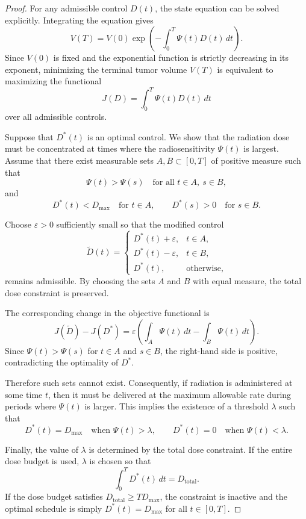 \documentclass[10pt,a4paper]{amsart}
\begin{document}
\begin{proof}
For any admissible control $D(t)$, the state equation can be solved explicitly. Integrating the equation gives
\[
V(T) = V(0)\exp\!\left(-\int_0^T \Psi(t)D(t)\,dt\right).
\]
Since $V(0)$ is fixed and the exponential function is strictly decreasing in its exponent, minimizing the terminal tumor volume
$V(T)$ is equivalent to maximizing the functional
\[
J(D) = \int_0^T \Psi(t)D(t)\,dt
\]
over all admissible controls.

Suppose that $D^*(t)$ is an optimal control. We show that the radiation dose must be concentrated at times where the radiosensitivity $\Psi(t)$ is largest. Assume that there exist measurable sets $A,B\subset[0,T]$ of positive measure such that
\[
\Psi(t)>\Psi(s) \quad \text{for all } t\in A,\ s\in B,
\]
and
\[
D^*(t) < D_{\max} \quad \text{for } t\in A, 
\qquad
D^*(s) > 0 \quad \text{for } s\in B.
\]

Choose $\varepsilon>0$ sufficiently small so that the modified control
\[
\widetilde D(t) =
\begin{cases}
D^*(t)+\varepsilon, & t\in A,\\
D^*(t)-\varepsilon, & t\in B,\\
D^*(t), & \text{otherwise},
\end{cases}
\]
remains admissible. By choosing the sets $A$ and $B$ with equal measure, the total dose constraint is preserved.

The corresponding change in the objective functional is
\[
J(\widetilde D) - J(D^*)
= \varepsilon
\left(
\int_A \Psi(t)\,dt
-
\int_B \Psi(t)\,dt
\right).
\]
Since $\Psi(t)>\Psi(s)$ for $t\in A$ and $s\in B$, the right-hand side is positive, contradicting the optimality of $D^*$.

Therefore such sets cannot exist. Consequently, if radiation is administered at some time $t$, then it must be delivered at the
maximum allowable rate during periods where $\Psi(t)$ is larger. This implies the existence of a threshold $\lambda$ such that
\[
D^*(t)=D_{\max} \quad \text{when } \Psi(t)>\lambda,
\qquad
D^*(t)=0 \quad \text{when } \Psi(t)<\lambda.
\]

Finally, the value of $\lambda$ is determined by the total dose constraint. If the entire dose budget is used, $\lambda$ is chosen so that
\[
\int_0^T D^*(t)\,dt = D_{\mathrm{total}}.
\]
If the dose budget satisfies $D_{\mathrm{total}} \ge T D_{\max}$, the constraint is inactive and the optimal schedule is simply
$D^*(t) = D_{\max}$ for all $t\in[0,T]$.
\end{proof}
\end{document}
